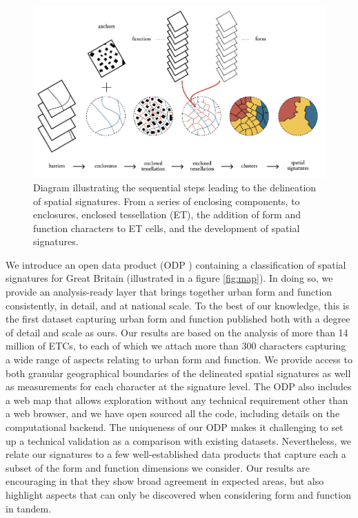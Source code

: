 \begin{figure}
        \includegraphics[width=\linewidth]{fig/workflow.pdf}
\caption{Diagram illustrating the sequential steps leading to the delineation of
spatial signatures. From a series of enclosing components, to enclosures,
enclosed tessellation (ET), the addition of form and function characters to ET
cells, and the development of spatial signatures.}
\label{fig:workflow}
\end{figure}

We introduce an open data product (ODP \cite{odp_paper21}) containing a classification of
spatial signatures for Great Britain (illustrated in a figure \ref{fig:map}). In doing so, we provide an
analysis-ready layer that brings together urban form and function consistently, in
detail, and at national scale. To the best of our knowledge, this is the first
dataset capturing urban form and function published both with a degree of detail and scale as
ours.
Our results are based on the analysis of more than 14 million of ETCs, to
each of which we attach more than 300 characters capturing a wide range of
aspects relating to urban form and function.
We provide access to both granular geographical boundaries of the delineated spatial signatures
as well as measurements for each character at the signature level.
The ODP also includes a web map that allows exploration without any technical
requirement other than a web browser, and we have open sourced all the code,
including details on the computational backend.
The uniqueness of our ODP makes it challenging to set up a technical validation as a
comparison with existing datasets. Nevertheless, we relate our
signatures to a few well-established data products that capture each a subset
of the form and function dimensions we consider. Our results are encouraging
in that they show broad agreement in expected areas, but also highlight
aspects that can only be discovered when considering form and function in tandem.



